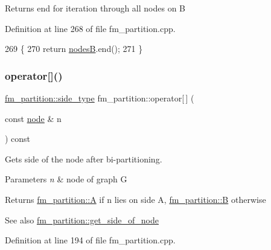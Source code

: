 \begin{DoxyReturn}{Returns}
end for iteration through all nodes on {\ttfamily B} 
\end{DoxyReturn}


Definition at line 268 of file fm\+\_\+partition.\+cpp.


\begin{DoxyCode}
269 \{
270     \textcolor{keywordflow}{return} \mbox{\hyperlink{classfm__partition_a3616b858b66682c528365a4803a4efad}{nodesB}}.end();
271 \}
\end{DoxyCode}
\mbox{\label{classfm__partition_a45ef6bc577ce894ead2c699678e26f1b}} 
\subsubsection{\texorpdfstring{operator[]()}{operator[]()}}
{\footnotesize\ttfamily \mbox{\hyperlink{classfm__partition_a7cdff1bea3740a287387e8408e16ca79}{fm\+\_\+partition\+::side\+\_\+type}} fm\+\_\+partition\+::operator\mbox{[}$\,$\mbox{]} (\begin{DoxyParamCaption}\item[{const \mbox{\hyperlink{classnode}{node}} \&}]{n }\end{DoxyParamCaption}) const}

Gets side of the node after bi-\/partitioning.


\begin{DoxyParams}{Parameters}
{\em n} & node of graph {\ttfamily G} \\
\hline
\end{DoxyParams}
\begin{DoxyReturn}{Returns}
{\ttfamily \mbox{\hyperlink{classfm__partition_a738e75c601403754e61e6dac623fd3ab}{fm\+\_\+partition\+::A}}} if {\ttfamily n} lies on side {\ttfamily A}, {\ttfamily \mbox{\hyperlink{classfm__partition_a42515c44eecb7ba3e2ec549a877ef238}{fm\+\_\+partition\+::B}}} otherwise 
\end{DoxyReturn}
\begin{DoxySeeAlso}{See also}
\mbox{\hyperlink{classfm__partition_af5f6ad817fe30760f3bc5470bd70c4c9}{fm\+\_\+partition\+::get\+\_\+side\+\_\+of\+\_\+node}} 
\end{DoxySeeAlso}


Definition at line 194 of file fm\+\_\+partition.\+cpp.


